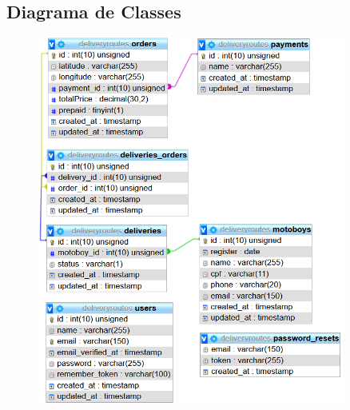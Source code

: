 
\begin{apendicesenv}
\partapendices

\chapter{Diagrama de Classes}
\label{chap:apendiceA}

\begin{figure}[H]
    \centering
    \includegraphics[width=0.9\textwidth]{./dados/figuras/apendiceA}
\end{figure}

\end{apendicesenv}
